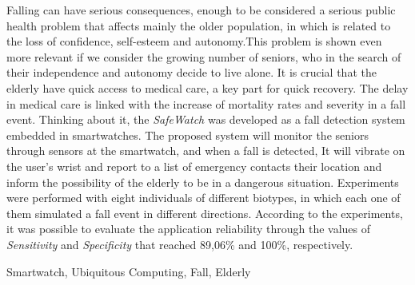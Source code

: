 
Falling can have serious consequences, enough to be considered a serious public health problem that affects mainly the older population, in which is related to the loss of confidence, self-esteem and autonomy.This problem is shown even more relevant if we consider the growing number of seniors, who in the search of their independence and autonomy decide to live alone. It is crucial that the elderly have quick access to medical care, a key part for  quick recovery. The delay in medical care is linked with the increase of mortality rates and severity in a fall event. Thinking about it, the \textit{SafeWatch} was developed as a fall detection system embedded in smartwatches. The proposed system will monitor the seniors through sensors at the smartwatch, and when a fall is detected, It will vibrate on the user's wrist and report to a list of emergency contacts their location and inform the possibility of the elderly to be in a dangerous situation. Experiments were performed with eight individuals of different biotypes, in which each one of them simulated a fall event in different directions. According to the experiments, it was possible to evaluate the application reliability through the values of \textit{Sensitivity} and \textit{Specificity} that reached 89,06\% and 100\%, respectively.



\begin{keywords}
	Smartwatch, Ubiquitous Computing,  Fall, Elderly
\end{keywords}